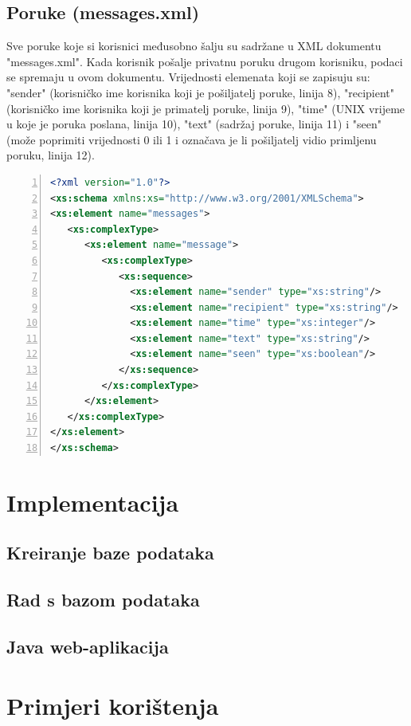 \documentclass{foi}
\begin{document}
\section{Poruke (messages.xml)}

Sve poruke koje si korisnici međusobno šalju su sadržane u XML dokumentu "messages.xml". Kada korisnik pošalje privatnu poruku drugom korisniku, podaci se spremaju u ovom dokumentu. Vrijednosti elemenata koji se zapisuju su: "sender" (korisničko ime korisnika koji je pošiljatelj poruke, linija 8), "recipient" (korisničko ime korisnika koji je primatelj poruke, linija 9), "time" (UNIX vrijeme u koje je poruka poslana, linija 10), "text" (sadržaj poruke, linija 11) i "seen" (može poprimiti vrijednosti 0 ili 1 i označava je li pošiljatelj vidio primljenu poruku, linija 12).

\begin{lstlisting}[language=XML, numbers=left, caption=XML Schema za dokument "messages.xml", captionpos=b]
 <?xml version="1.0"?>
<xs:schema xmlns:xs="http://www.w3.org/2001/XMLSchema">
<xs:element name="messages">
   <xs:complexType>
      <xs:element name="message">
         <xs:complexType>
            <xs:sequence>
              <xs:element name="sender" type="xs:string"/>
              <xs:element name="recipient" type="xs:string"/>
              <xs:element name="time" type="xs:integer"/>
              <xs:element name="text" type="xs:string"/>
              <xs:element name="seen" type="xs:boolean"/>
            </xs:sequence>
         </xs:complexType>
      </xs:element>
   </xs:complexType>
</xs:element>
</xs:schema> 
\end{lstlisting}

\chapter{Implementacija}

\section{Kreiranje baze podataka}
\section{Rad s bazom podataka}
\section{Java web-aplikacija}

\chapter{Primjeri korištenja}
\end{document}
